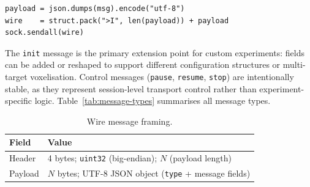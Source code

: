 \begin{lstlisting}[style=py, caption={Length-prefixed framing for TCP
messages.}, label={lst:wire-frame}]
payload = json.dumps(msg).encode("utf-8")
wire    = struct.pack(">I", len(payload)) + payload
sock.sendall(wire)
\end{lstlisting}

The \texttt{init} message is the primary extension point for custom
experiments: fields can be added or reshaped to support different
configuration structures or multi-target voxelisation. Control messages
(\texttt{pause}, \texttt{resume}, \texttt{stop}) are intentionally stable,
as they represent session-level transport control rather than
experiment-specific logic. Table~\ref{tab:message-types} summarises all
message types.

\begin{table}[htbp]
    \centering
    \small
    \begin{tabular}{p{}p{}}
        \hline
        \textbf{Field} & \textbf{Value}\\
        \hline
        Header  & 4 bytes; \texttt{uint32} (big-endian); $N$ (payload
                  length)\\
        Payload & $N$ bytes; UTF-8 JSON object (\texttt{type} + message
                  fields)\\
        \hline
    \end{tabular}
    \caption{Wire message framing.}
    \label{tab:message-frame-format}
\end{table}

